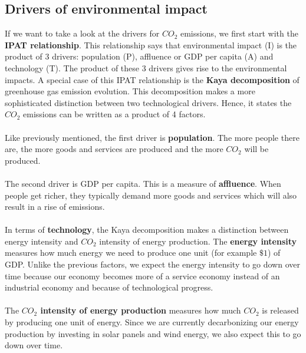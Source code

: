 \documentclass[../summary.tex]{subfiles}
\begin{document}
	\subsection{Drivers of environmental impact}
	
	If we want to take a look at the drivers for $CO_{2}$ emissions, we first start with the \textbf{IPAT relationship}. This relationship says that environmental impact (I) is the product of 3 drivers: population (P), affluence or GDP per capita (A) and technology (T). The product of these 3 drivers gives rise to the environmental impacts. A special case of this IPAT relationship is the \textbf{Kaya decomposition} of greenhouse gas emission evolution. This decomposition makes a more sophisticated distinction between two technological drivers. Hence, it states the $CO_{2}$ emissions can be written as a product of 4 factors.
	\\\\
	Like previously mentioned, the first driver is \textbf{population}. The more people there are, the more goods and services are produced and the more $CO_{2}$ will be produced. 
	\\\\
	The second driver is GDP per capita. This is a measure of \textbf{affluence}. When people get richer, they typically demand more goods and services which will also result in a rise of emissions.
	\\\\
	In terms of \textbf{technology}, the Kaya decomposition makes a distinction between energy intensity and $CO_{2}$ intensity of energy production. The \textbf{energy intensity} measures how much energy we need to produce one unit (for example $\$1$) of GDP. Unlike the previous factors, we expect the energy intensity to go down over time because our economy becomes more of a service economy instead of an industrial economy and because of technological progress. \\\\
	The \textbf{$CO_{2}$ intensity of energy production} measures how much $CO_{2}$ is released by producing one unit of energy. Since we are currently decarbonizing our energy production by investing in solar panels and wind energy, we also expect this to go down over time.
	\\\\
\end{document}
